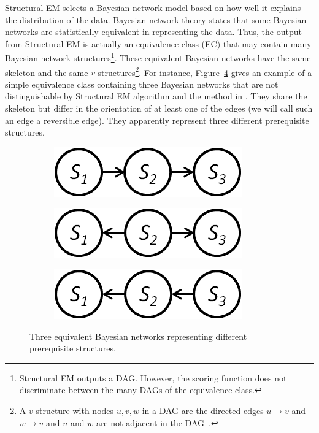 \documentclass{edm_template}
\begin{document}
Structural EM selects a Bayesian network model based on how well it explains the distribution of the data. 
Bayesian network theory states that some Bayesian networks are statistically equivalent in representing the data.
Thus, the output from Structural EM is actually an equivalence class (EC) that may contain many Bayesian network structures\footnote{Structural EM outputs a DAG. However,  the scoring function  does not discriminate between the many DAGs of the equivalence class.}.
These equivalent Bayesian networks have the same skeleton and the same $v$-structures\footnote{A $v$-structure with nodes $u,v,w$ in a DAG are the directed edges $u\rightarrow v$ and $w\rightarrow v$ and $u$ and $w$ are not adjacent in the DAG~\cite{verma1990equivalence}.}. 
For instance, Figure~\ref{fig:equivnets} gives an example of a simple equivalence class containing three Bayesian networks 
that are not distinguishable by Structural EM algorithm and the method in \cite{scheines2014discovering}.
They share the skeleton but differ in the orientation of at least one of the edges (we will call such an edge a reversible edge). 
They apparently represent three different prerequisite structures.

	\begin{figure}[!ht]\small
		\centering
		\begin{subfigure}[t]{0.32\linewidth}
			\centering
			\includegraphics[width=0.9\linewidth]{figures/s1s2s3.png}
			\caption{\label{fig:equivnet1}}
		\end{subfigure}
		\begin{subfigure}[t]{0.32\linewidth}
			\centering
			\includegraphics[width=0.9\linewidth]{figures/s2s1s3.png}
			\caption{\label{fig:equivnet2}}
		\end{subfigure}
		\begin{subfigure}[t]{0.32\linewidth}
			\centering
			\includegraphics[width=0.9\linewidth]{figures/s3s2s1.png}
			\caption{\label{fig:equivnet3}}			
		\end{subfigure}		
		\caption{Three equivalent Bayesian networks representing different prerequisite structures.\label{fig:equivnets} }
	\end{figure}
	
\end{document}
